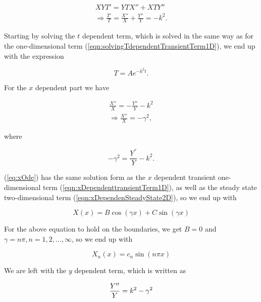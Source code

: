 \documentclass{article}
\begin{document}
\begin{subequations}
	\begin{eqnarray}
	XYT' = YTX'' + XTY'' \\
	\Rightarrow \frac{T'}{T} = \frac{X''}{X} + \frac{Y''}{Y} = -k^2.
	\end{eqnarray}
\end{subequations}

Starting by solving the $t$ dependent term, which is solved in the same way as for the one-dimensional term (\ref{eqn:solvingTdependentTransientTerm1D}), we end up with the expression

\begin{equation}
T=Ae^{-k^2t}.
\label{eqn:2DtransientTdependentGeneralTerm}
\end{equation}

For the $x$ dependent part we have 

\begin{subequations}
	\begin{eqnarray}\label{eq:xOde}
	\frac{X''}{X} = -\frac{Y''}{Y} - k^2\\
	\Rightarrow \frac{X''}{X} = -\gamma^2,
	\end{eqnarray}
\end{subequations}

where 

\begin{equation}\label{eq:gamma}
	-\gamma^2 = \frac{Y^{''}}{Y} - k^2.
\end{equation}

(\ref{eq:xOde}) has the same solution form as the $x$ dependent transient one-dimensional term (\ref{eqn:xDependenttransientTerm1D}), as well as the steady state two-dimensional term (\ref{eqn:xDependenSteadyState2D}), so we end up with 

\begin{equation}
X(x) = B\cos(\gamma x) + C\sin(\gamma x)
\end{equation}

For the above equation to hold on the boundaries, we get  $B=0$ and $\gamma = n\pi, n=1,2,...,\infty$, so we end up with

\begin{equation}
X_n(x) = c_n\sin(n\pi x)
\label{eqn:2DtransientXdependentTerm}
\end{equation}

We are left with the $y$ dependent term, which is written as 

\begin{subequations}
	\begin{equation}
	\frac{Y''}{Y} = k^2 - \gamma^2\\
	\end{equation}
\end{subequations}
\end{document}
